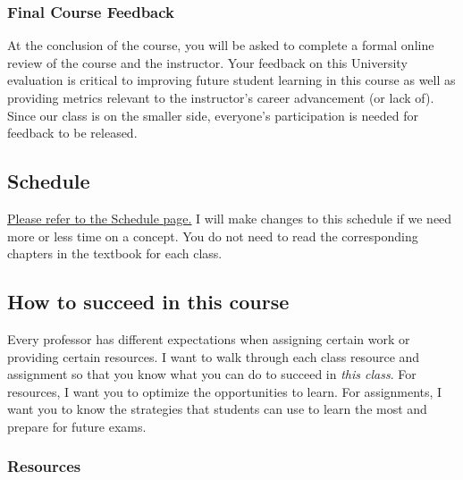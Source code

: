 \documentclass[
  letterpaper,
  DIV=11,
  numbers=noendperiod]{scrartcl}
\begin{document}
\subsubsection{Final Course Feedback}\label{final-course-feedback}

At the conclusion of the course, you will be asked to complete a formal
online review of the course and the instructor. Your feedback on this
University evaluation is critical to improving future student learning
in this course as well as providing metrics relevant to the instructor's
career advancement (or lack of). Since our class is on the smaller side,
everyone's participation is needed for feedback to be released.

\subsection{Schedule}\label{schedule}

\href{./schedule.qmd}{Please refer to the Schedule page.} I will make
changes to this schedule if we need more or less time on a concept. You
do not need to read the corresponding chapters in the textbook for each
class.

\subsection{How to succeed in this
course}\label{how-to-succeed-in-this-course}

Every professor has different expectations when assigning certain work
or providing certain resources. I want to walk through each class
resource and assignment so that you know what you can do to succeed in
\emph{this class}. For resources, I want you to optimize the
opportunities to learn. For assignments, I want you to know the
strategies that students can use to learn the most and prepare for
future exams.

\subsubsection{Resources}\label{resources}
\end{document}
